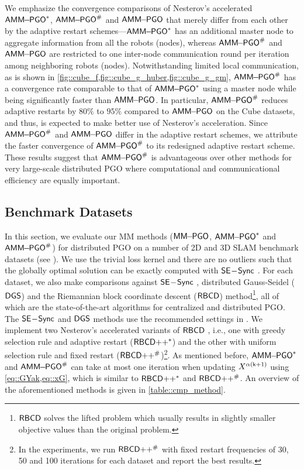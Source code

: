 We emphasize the convergence comparisons of Nesterov's accelerated $\mathsf{AMM\!\!-\!\!PGO}^*$, $\mathsf{AMM\!\!-\!\!PGO}^{\#}$ and $\mathsf{AMM\!\!-\!\!PGO}$ that merely differ from each other by the adaptive restart schemes---$\mathsf{AMM\!\!-\!\!PGO}^*$ has an additional master node to aggregate information from all the robots (nodes), whereas $\mathsf{AMM\!\!-\!\!PGO}^{\#}$ and $\mathsf{AMM\!\!-\!\!PGO}$ are restricted to one inter-node communication round per iteration among neighboring robots (nodes). Notwithstanding limited local communication, as is shown in \cref{fig::cube_f,fig::cube_g_huber,fig::cube_g_gm}, $\mathsf{AMM\!\!-\!\!PGO}^{\#}$ has a convergence rate comparable to that of $\mathsf{AMM\!\!-\!\!PGO}^*$ using a master node while being significantly faster than $\mathsf{AMM\!\!-\!\!PGO}$.  {\highlight In particular,  $\mathsf{AMM\!\!-\!\!PGO}^{\#}$ reduces adaptive restarts by $80\%$ to $95\%$ compared to $\mathsf{AMM\!\!-\!\!PGO}$ on the \textsf{\small Cube} datasets}, and thus, is expected to make better use of Nesterov's acceleration. Since $\mathsf{AMM\!\!-\!\!PGO}^{\#}$ and $\mathsf{AMM\!\!-\!\!PGO}$ differ in the adaptive restart schemes, we attribute the faster convergence of $\mathsf{AMM\!\!-\!\!PGO}^{\#}$ to its redesigned adaptive restart scheme. These results suggest that $\mathsf{AMM\!\!-\!\!PGO}^{\#}$ is advantageous over other methods for very large-scale distributed PGO where computational and communicational efficiency are equally important.

\vspace{-0.5em}

%



\vspace{-0.5em}
\subsection{Benchmark Datasets}\label{subsection::experiment::benchmark}
In this section, we evaluate our MM methods ($\mathsf{MM\!\!-\!\!PGO}$, $\mathsf{AMM\!\!-\!\!PGO}^*$ and $\mathsf{AMM\!\!-\!\!PGO}^{\#}$) for distributed PGO on a number of 2D and 3D SLAM benchmark datasets \cite{rosen2016se} (see \datasetinfo). We use the trivial loss kernel and there are no outliers such that the globally optimal solution can be exactly computed with $\mathsf{SE\!-\!Sync}$ \cite{rosen2016se}. For each dataset, we also make comparisons against $\mathsf{SE\!-\!Sync}$ \cite{rosen2016se}, distributed Gauss-Seidel ($\mathsf{DGS}$) \cite{choudhary2017distributed} and the Riemannian block coordinate descent ($\mathsf{RBCD}$) \cite{tian2019distributed} method\footnote{$\mathsf{RBCD}$ \cite{tian2019distributed} solves the lifted problem which usually results in slightly smaller objective values than the original problem.}, all of which are the state-of-the-art algorithms for centralized and distributed PGO. The $\mathsf{SE\!-\!Sync}$ and $\mathsf{DGS}$ methods use the recommended settings in \cite{choudhary2017distributed,rosen2016se}. We implement two Nesterov's accelerated variants of $\mathsf{RBCD}$  \cite{tian2019distributed}, i.e., one with greedy selection rule and adaptive restart ($\rbcdc$) and the other with uniform selection rule and fixed restart ($\rbcdd$)\footnote{In the experiments, we run $\rbcdd$ \cite{tian2019distributed} with fixed restart frequencies of 30, 50 and 100 iterations for each dataset and report the best results.}. As mentioned before, $\mathsf{AMM\!\!-\!\!PGO}^*$ and $\mathsf{AMM\!\!-\!\!PGO}^{\#}$ can take at most one iteration when updating $X^{\alpha(\mathsf{k}+1)}$ using \cref{eq::GYak,eq::xG}, which is similar to $\rbcdc$ and $\rbcdd$. An overview of the aforementioned methods is given in \cref{table::cmp_method}.

